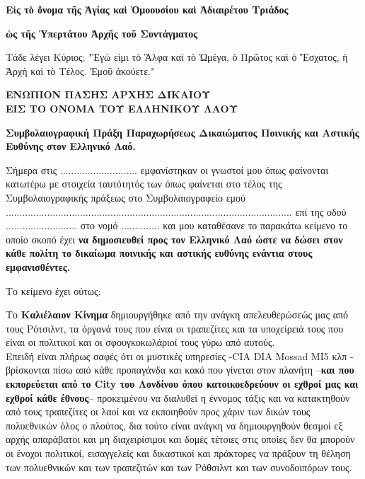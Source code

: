 \documentclass[a4paper]{article}
\begin{document}
\textbf{\large \centering Εἰς τὸ ὄνομα τῆς Ἁγίας καὶ Ὀμοουσίου καὶ Ἀδιαιρέτου Τριάδος\\}\par
\textbf{\large \centering ὡς τῆς Ὑπερτάτου Ἀρχῆς τοῦ Συντάγματος\\}\par

\begin{flushright}
{\scriptsize   Τάδε λέγει Κύριος: "Ἑγὼ εἰμι τὸ Ἄλφα καὶ τὸ Ὠμέγα, ὁ Πρῶτος καὶ ὁ Ἔσχατος, ἡ Ἀρχὴ καὶ τὸ Τέλος. Ἐμοῦ ἀκούετε."\\}
\end{flushright}

\textbf{\large \centering ΕΝΩΠΙΟΝ ΠΑΣΗΣ ΑΡΧΗΣ ΔΙΚΑΙΟΥ \\ ΕΙΣ ΤΟ ΟΝΟΜΑ ΤΟΥ ΕΛΛΗΝΙΚΟΥ ΛΑΟΥ\\}\par


\textbf{\Large \centering Συμβολαιογραφική Πράξη Παραχωρήσεως Δικαιώματος Ποινικής και Αστικής Ευθύνης στον Ελληνικό Λαό.\\}\par

\setlength{\parindent}{5mm}

Σήμερα στις ............................ εμφανίστηκαν οι γνωστοί μου όπως φαίνονται κατωτέρω με στοιχεία ταυτότητός των όπως φαίνεται στο τέλος της Συμβολαιογραφικής πράξεως στο Συμβολαιογραφείο εμού ........................................................................................................ επί της οδού .......................... στο νομό .............. και μου καταθέσανε το παρακάτω κείμενο το οποίο σκοπό έχει \textbf{να δημοσιευθεί προς τον Ελληνικό Λαό ώστε να δώσει στον κάθε πολίτη το δικαίωμα ποινικής και αστικής ευθύνης ενάντια στους εμφανισθέντες.}\par
Το κείμενο έχει ούτως:\par

Το \textbf{Καλιέλαιον Κίνημα} δημιουργήθηκε από την ανάγκη απελευθερώσεώς μας από τους Ρότσιλντ, τα όργανά τους που είναι οι τραπεζίτες και τα υποχείρειά τους που είναι οι πολιτικοί και οι σφουγκοκωλάριοί τους γύρω από αυτούς. \\ Επειδή είναι πλήρως σαφές ότι οι μυστικές υπηρεσίες -CIA DIA Mossad MI5 κλπ - βρίσκονται πίσω από κάθε προπαγάνδα και κακό που γίνεται στον πλανήτη --\textbf{και που εκπορεύεται από το City του Λονδίνου όπου κατοικοεδρεύουν οι εχθροί μας και εχθροί κάθε έθνους}-- προκειμένου να διαλυθεί η έννομος τάξις και να κατακτηθούν από τους τραπεζίτες οι λαοί και να εκποιηθούν προς χάριν των δικών τους πολυεθνικών όλος ο πλούτος, δια τούτο είναι ανάγκη να δημιουργηθούν θεσμοί εξ αρχής απαράβατοι και μη διαχειρίσιμοι και δομές τέτοιες στις οποίες δεν θα μπορούν οι ένοχοι πολιτικοί, εισαγγελείς και δικαστικοί και πράκτορες να πράξουν τη θέληση των πολυεθνικών και των τραπεζιτών και των Ρόθσιλντ και των συνοδοιπόρων τους.
\end{document}
